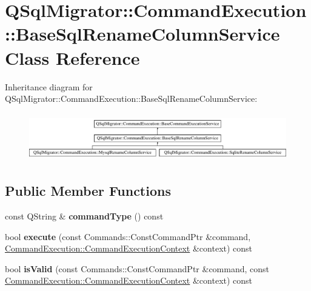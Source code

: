 \hypertarget{class_q_sql_migrator_1_1_command_execution_1_1_base_sql_rename_column_service}{}\section{Q\+Sql\+Migrator\+:\+:Command\+Execution\+:\+:Base\+Sql\+Rename\+Column\+Service Class Reference}
\label{class_q_sql_migrator_1_1_command_execution_1_1_base_sql_rename_column_service}
Inheritance diagram for Q\+Sql\+Migrator\+:\+:Command\+Execution\+:\+:Base\+Sql\+Rename\+Column\+Service\+:\begin{figure}[H]
\begin{center}
\leavevmode
\includegraphics[height=2.105263cm]{class_q_sql_migrator_1_1_command_execution_1_1_base_sql_rename_column_service}
\end{center}
\end{figure}
\subsection*{Public Member Functions}
\begin{DoxyCompactItemize}
\item 
\mbox{\label{class_q_sql_migrator_1_1_command_execution_1_1_base_sql_rename_column_service_a0730bd4569b311e6a0bf3f141e28dac5}} 
const Q\+String \& {\bfseries command\+Type} () const
\item 
\mbox{\label{class_q_sql_migrator_1_1_command_execution_1_1_base_sql_rename_column_service_ae56b771f42a573520402c232e4238985}} 
bool {\bfseries execute} (const Commands\+::\+Const\+Command\+Ptr \&command, \hyperlink{class_q_sql_migrator_1_1_command_execution_1_1_command_execution_context}{Command\+Execution\+::\+Command\+Execution\+Context} \&context) const
\item 
\mbox{\label{class_q_sql_migrator_1_1_command_execution_1_1_base_sql_rename_column_service_af585a49b13bc0a1a4b164d0fd37a6797}} 
bool {\bfseries is\+Valid} (const Commands\+::\+Const\+Command\+Ptr \&command, const \hyperlink{class_q_sql_migrator_1_1_command_execution_1_1_command_execution_context}{Command\+Execution\+::\+Command\+Execution\+Context} \&context) const
\end{DoxyCompactItemize}

